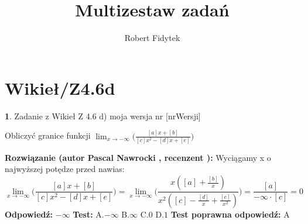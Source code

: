 \documentclass[12pt, a4paper]{article}
\title{Multizestaw zadań}
\author{Robert Fidytek}
\date{}
\theoremstyle{definition} %
\newtheorem{zad}{}
\newcommand{\kategoria}[1]{\section{#1}} %
\newcommand{\zadStart}[1]{\begin{zad}#1\newline} %
\newcommand{\zadStop}{\end{zad}}   %
\newcommand{\rozwStart}[2]{\noindent \textbf{Rozwiązanie (autor #1 , recenzent #2): }\newline} %
\newcommand{\rozwStop}{\newline}                                            %
\newcommand{\odpStart}{\noindent \textbf{Odpowiedź:}\newline}    %
\newcommand{\odpStop}{\newline}                                             %
\newcommand{\testStart}{\noindent \textbf{Test:}\newline} %
\newcommand{\testStop}{\newline} %
\newcommand{\kluczStart}{\noindent \textbf{Test poprawna odpowiedź:}\newline} %
\newcommand{\kluczStop}{\newline} %
\begin{document}
\maketitle


\kategoria{Wikieł/Z4.6d}
\zadStart{Zadanie z Wikieł Z 4.6 d) moja wersja nr [nrWersji]}

Obliczyć granice funkcji $\displaystyle{\lim_{x \to -\infty}}\bigg(\frac{[a]x+[b]}{[c]x^2-[d]x+[e]}\bigg)$
\zadStop
\rozwStart{Pascal Nawrocki}{}
Wyciągamy x o najwyższej potędze przed nawias:
$$\displaystyle{\lim_{x \to -\infty}}\bigg(\frac{[a]x+[b]}{[c]x^2-[d]x+[e]}\bigg)=\displaystyle{\lim_{x \to -\infty}}\bigg(\frac{x([a]+\frac{[b]}{x})}{x^2([c]-\frac{[d]}{x}+\frac{[e]}{x^2})}\bigg)=\frac{[a]}{-\infty\cdot[c]}=0$$
\rozwStop
\odpStart
$-\infty$
\odpStop
\testStart
A.$-\infty$
B.$\infty$
C.$0$
D.$1$
\testStop
\kluczStart
A
\kluczStop
\end{document}

